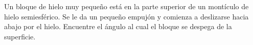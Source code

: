 \begin{mdframed}[style=warning]
	\begin{ejercicio}
		Un bloque de hielo muy pequeño está en la parte superior de un montículo de hielo semiesférico. Se le da un pequeño empujón y comienza a deslizarse hacia abajo por el hielo. Encuentre el ángulo al cual el bloque se despega de la superficie.
	\end{ejercicio}
\end{mdframed}













































































